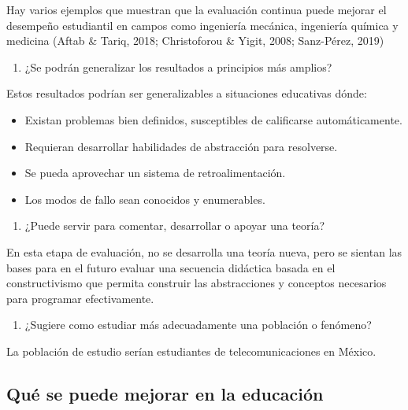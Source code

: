 \documentclass[
  12,
]{scrartcl}
\providecommand{\tightlist}{%
  \setlength{\itemsep}{0pt}\setlength{\parskip}{0pt}}
\begin{document}
Hay varios ejemplos que muestran que la evaluación continua puede
mejorar el desempeño estudiantil en campos como ingeniería mecánica,
ingeniería química y medicina (Aftab \& Tariq, 2018; Christoforou \&
Yigit, 2008; Sanz-Pérez, 2019)

\begin{enumerate}
\def\labelenumi{\arabic{enumi}.}
\setcounter{enumi}{8}
\tightlist
\item
  ¿Se podrán generalizar los resultados a principios más amplios?
\end{enumerate}

Estos resultados podrían ser generalizables a situaciones educativas
dónde:

\begin{itemize}
\tightlist
\item
  Existan problemas bien definidos, susceptibles de calificarse
  automáticamente.
\item
  Requieran desarrollar habilidades de abstracción para resolverse.
\item
  Se pueda aprovechar un sistema de retroalimentación.
\item
  Los modos de fallo sean conocidos y enumerables.
\end{itemize}

\begin{enumerate}
\def\labelenumi{\arabic{enumi}.}
\setcounter{enumi}{9}
\tightlist
\item
  ¿Puede servir para comentar, desarrollar o apoyar una teoría?
\end{enumerate}

En esta etapa de evaluación, no se desarrolla una teoría nueva, pero se
sientan las bases para en el futuro evaluar una secuencia didáctica
basada en el constructivismo que permita construir las abstracciones y
conceptos necesarios para programar efectivamente.

\begin{enumerate}
\def\labelenumi{\arabic{enumi}.}
\setcounter{enumi}{10}
\tightlist
\item
  ¿Sugiere como estudiar más adecuadamente una población o fenómeno?
\end{enumerate}

La población de estudio serían estudiantes de telecomunicaciones en
México.

\hypertarget{quuxe9-se-puede-mejorar-en-la-educaciuxf3n}{%
\subsection{Qué se puede mejorar en la
educación}\label{quuxe9-se-puede-mejorar-en-la-educaciuxf3n}}
\end{document}
